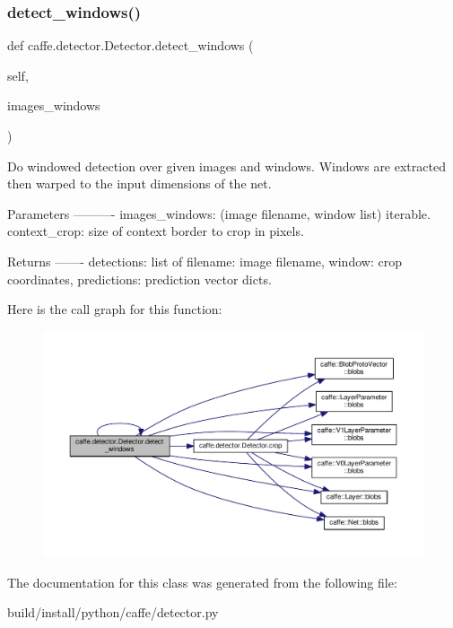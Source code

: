 \subsubsection{\texorpdfstring{detect\+\_\+windows()}{detect\_windows()}\hspace{0.1cm}{\footnotesize\ttfamily [2/2]}}
{\footnotesize\ttfamily def caffe.\+detector.\+Detector.\+detect\+\_\+windows (\begin{DoxyParamCaption}\item[{}]{self,  }\item[{}]{images\+\_\+windows }\end{DoxyParamCaption})}

\begin{DoxyVerb}Do windowed detection over given images and windows. Windows are
extracted then warped to the input dimensions of the net.

Parameters
----------
images_windows: (image filename, window list) iterable.
context_crop: size of context border to crop in pixels.

Returns
-------
detections: list of {filename: image filename, window: crop coordinates,
    predictions: prediction vector} dicts.
\end{DoxyVerb}
 Here is the call graph for this function\+:
\nopagebreak
\begin{figure}[H]
\begin{center}
\leavevmode
\includegraphics[width=350pt]{classcaffe_1_1detector_1_1_detector_a7ddd403050bacd8fcccc62705f2405ff_cgraph}
\end{center}
\end{figure}


The documentation for this class was generated from the following file\+:\begin{DoxyCompactItemize}
\item 
build/install/python/caffe/detector.\+py\end{DoxyCompactItemize}
